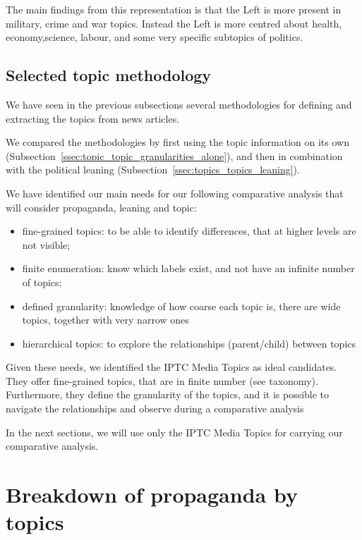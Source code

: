 The main findings from this representation is that the Left is more present in military, crime and war topics. Instead the Left is more centred about health, economy,science, labour, and some very specific subtopics of politics.


\subsection{\statusgreen Selected topic methodology}
\label{ssec:topic_topic_choice}

We have seen in the previous subsections several methodologies for defining and extracting the topics from news articles.

We compared the methodologies by first using the topic information on its own (Subsection~\ref{ssec:topic_topic_granularities_alone}), and then in combination with the political leaning (Subsection~\ref{ssec:topics_topics_leaning}).

We have identified our main needs for our following comparative analysis that will consider propaganda, leaning and topic:

\begin{itemize}
    \item fine-grained topics: to be able to identify differences, that at higher levels are not visible;
    \item finite enumeration: know which labels exist, and not have an infinite number of topics;
    \item defined granularity: knowledge of how coarse each topic is, there are wide topics, together with very narrow ones
    \item hierarchical topics: to explore the relationships (parent/child) between topics
\end{itemize}

Given these needs, we identified the IPTC Media Topics as ideal candidates.
They offer fine-grained topics, that are in finite number (see taxonomy). Furthermore, they define the granularity of the topics, and it is possible to navigate the relationships and observe during a comparative analysis 

In the next sections, we will use only the IPTC Media Topics for carrying our comparative analysis.


\section{\statusgreen Breakdown of propaganda by topics}
\label{sec:topic_propaganda}

